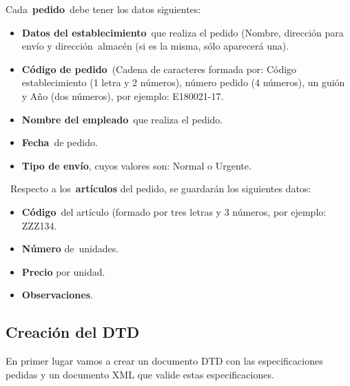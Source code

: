 Cada \textbf{pedido} debe tener los datos siguientes:

\begin{itemize}
    \item \textbf{Datos del establecimiento} que realiza el pedido (Nombre, dirección para envío y dirección almacén (si es la misma, sólo aparecerá una).
    \item \textbf{Código de pedido} (Cadena de caracteres formada por: Código establecimiento (1 letra y 2 números), número pedido (4 números), un guión y Año (dos números), por ejemplo: E180021-17.
    \item \textbf{Nombre del empleado} que realiza el pedido.
    \item \textbf{Fecha} de pedido.
    \item\textbf{Tipo de envío}, cuyos valores son: Normal o Urgente.
\end{itemize}

 Respecto a los \textbf{artículos} del pedido, se guardarán los siguientes datos:

\begin{itemize}
    \item \textbf{Código} del artículo (formado por tres letras y 3 números, por ejemplo: ZZZ134.
    \item \textbf{Número} de unidades.
    \item \textbf{Precio} por unidad.
    \item \textbf{Observaciones}.
\end{itemize}



\subsection{Creación del DTD}
En primer lugar vamos a crear un documento DTD con las especificaciones pedidas y un documento XML que valide estas especificaciones.

